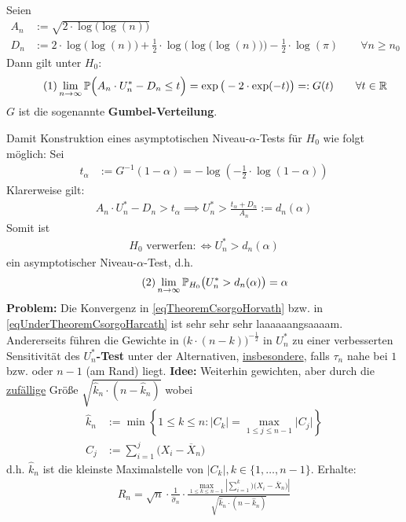 \begin{thm}\label{theoremCH} %
	Seien
	\begin{align*}
		A_n&:=\sqrt{2\cdot\log\big(\log(n)\big)}\\
		D_n&:=2\cdot\log\big(\log(n)\big)+\frac{1}{2}\cdot\log\Big(\log\big(\log(n)\big)\Big)-\frac{1}{2}\cdot\log(\pi)\qquad\forall n\geq n_0
	\end{align*}
	Dann gilt unter $H_0$:
	\begin{align}\label{eqTheoremCsorgoHorvath}\tag{1}
		\lim\limits_{n\to\infty}\mathbb{P}\Big(A_n\cdot U_n^\ast-D_n\leq t\Big)=\exp\big(-2\cdot\exp(-t)\big)=:G(t)
		\qquad\forall t\in\mathbb{R}
	\end{align}
	$G$ ist die sogenannte \textbf{Gumbel-Verteilung}.
\end{thm}

Damit Konstruktion eines asymptotischen Niveau-$\alpha$-Tests für $H_0$ wie folgt möglich: Sei
\begin{align*}
	t_\alpha&:=G^{-1}(1-\alpha)=-\log\left(-\frac{1}{2}\cdot\log(1-\alpha)\right)
\end{align*}
Klarerweise gilt:
\begin{align*}
	A_n\cdot U_n^\ast-D_n>t_\alpha\implies U_n^\ast>\frac{t_\alpha+D_n}{A_n}:=d_n(\alpha)
\end{align*}
Somit ist 
\begin{align*}
	H_0\text{ verwerfen}:\Longleftrightarrow U_n^\ast>d_n(\alpha)
\end{align*}
ein asymptotischer Niveau-$\alpha$-Test, d.h.
\begin{align}\label{eqUnderTheoremCsorgoHarcath}\tag{2}
	\lim\limits_{n\to\infty}\mathbb{P}_{H_0}\big(U_n^\ast>d_n(\alpha)\big)=\alpha
\end{align}
\textbf{Problem:} Die Konvergenz in \eqref{eqTheoremCsorgoHorvath} bzw. in \eqref{eqUnderTheoremCsorgoHarcath} ist sehr sehr sehr laaaaaangsaaaam. %
Andererseits führen die Gewichte in $\big(k\cdot(n-k)\big)^{-\frac{1}{2}}$ in $U_n^\ast$ zu einer verbesserten Sensitivität des \textbf{$U_n^\ast$-Test} unter der Alternativen, \underline{insbesondere}, falls $\tau_n$ nahe bei $1$ bzw. oder $n-1$ (am Rand) liegt.\nl
\textbf{Idee:} Weiterhin gewichten, aber durch die \ul{zufällige} Größe $\sqrt{\hat{k}_n\cdot(n-\hat{k}_n)}$ wobei 
\begin{align*}
	\hat{k}_n&:=\min\left\lbrace 1\leq k\leq n:\big|C_k\big|=\max\limits_{1\leq j\leq n-1}\big|C_j\big|\right\rbrace\\
	C_j&:=\sum\limits_{i=1}^j \big(X_i-\overline{X}_n\big)
\end{align*}
d.h. $\hat{k}_n$ ist die kleinste Maximalstelle von $|C_k|,k\in\lbrace1,\ldots,n-1\rbrace$. Erhalte:
\begin{align*}
	R_n=\sqrt{n}\cdot\frac{1}{\hat{\sigma}_n}\cdot\frac{\max\limits_{1\leq k\leq n-1}\left|\sum\limits_{i=1}^k\big)(X_i-\overline{X}_n\big)\right|}{\sqrt{\hat{k}_n\cdot(n-\hat{k}_n)}}
\end{align*}

